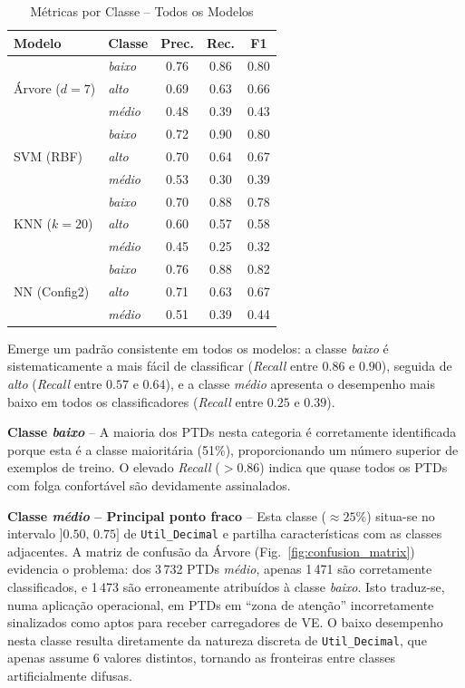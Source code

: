 \documentclass[conference]{IEEEtran}
\begin{document}
\begin{table}[htbp]
\caption{M\'etricas por Classe -- Todos os Modelos}
\label{tab:por_classe}
\centering
\renewcommand{\arraystretch}{1.15}
\begin{tabular}{llccc}
\toprule
\textbf{Modelo} & \textbf{Classe} & \textbf{Prec.} & \textbf{Rec.} & \textbf{F1} \\
\midrule
\multirow{3}{*}{\'Arvore ($d=7$)}
  & \textit{baixo} & 0.76 & 0.86 & 0.80 \\
  & \textit{alto}  & 0.69 & 0.63 & 0.66 \\
  & \textit{m\'edio} & 0.48 & 0.39 & 0.43 \\
\midrule
\multirow{3}{*}{SVM (RBF)}
  & \textit{baixo} & 0.72 & 0.90 & 0.80 \\
  & \textit{alto}  & 0.70 & 0.64 & 0.67 \\
  & \textit{m\'edio} & 0.53 & 0.30 & 0.39 \\
\midrule
\multirow{3}{*}{KNN ($k=20$)}
  & \textit{baixo} & 0.70 & 0.88 & 0.78 \\
  & \textit{alto}  & 0.60 & 0.57 & 0.58 \\
  & \textit{m\'edio} & 0.45 & 0.25 & 0.32 \\
\midrule
\multirow{3}{*}{NN (Config2)}
  & \textit{baixo} & 0.76 & 0.88 & 0.82 \\
  & \textit{alto}  & 0.71 & 0.63 & 0.67 \\
  & \textit{m\'edio} & 0.51 & 0.39 & 0.44 \\
\bottomrule
\end{tabular}
\end{table}
 
Emerge um padr\~ao consistente em todos os modelos: a classe
\textit{baixo} \'e sistematicamente a mais f\'acil de classificar
(\textit{Recall} entre $0.86$ e $0.90$), seguida de \textit{alto}
(\textit{Recall} entre $0.57$ e $0.64$), e a classe \textit{m\'edio}
apresenta o desempenho mais baixo em todos os classificadores
(\textit{Recall} entre $0.25$ e $0.39$).
 
\textbf{Classe \textit{baixo}} -- A maioria dos PTDs nesta categoria \'e
corretamente identificada porque esta \'e a classe maioritária (51\%),
proporcionando um n\'umero superior de exemplos de treino. O elevado
\textit{Recall} ($>0.86$) indica que quase todos os PTDs com folga
confort\'avel s\~ao devidamente assinalados.
 
\textbf{Classe \textit{m\'edio} -- Principal ponto fraco} -- Esta classe
($\approx25\%$) situa-se no intervalo $]0.50,\,0.75]$ de
\texttt{Util\_Decimal} e partilha caracter\'isticas com as classes
adjacentes. A matriz de confus\~ao da \'Arvore (Fig.~\ref{fig:confusion_matrix})
evidencia o problema: dos 3\,732 PTDs \textit{m\'edio}, apenas 1\,471
s\~ao corretamente classificados, e 1\,473 s\~ao erroneamente atribuídos
\`a classe \textit{baixo}. Isto traduz-se, numa aplica\c{c}\~ao
operacional, em PTDs em ``zona de aten\c{c}\~ao'' incorretamente
sinalizados como aptos para receber carregadores de VE. O baixo
desempenho nesta classe resulta diretamente da natureza discreta de
\texttt{Util\_Decimal}, que apenas assume 6 valores distintos, tornando
as fronteiras entre classes artificialmente difusas.
 
\end{document}
